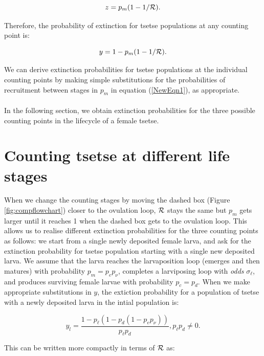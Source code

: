 \documentclass[smallextended]{svjour3}
\begin{document}
$$ z = p_m(1-1/{\cal R}).$$

Therefore,  the probability of extinction for tsetse populations at any counting point is:

\begin{equation}
\label{NewEqn1}	
y = 1 - p_m(1-1/{\cal R}).	
\end{equation}

We can derive extinction probabilities for tsetse populations at the individual counting points by making simple substitutions for the probabilities of recruitment  between stages in $p_m$  in equation (\ref{NewEqn1}), as appropriate. 
\paragraph{}


\paragraph{}
In the following section, we obtain extinction probabilities  for the three possible counting points in the lifecycle of a female tsetse.

\section{Counting tsetse at different life stages}

When we change the counting stages by moving the dashed box (Figure \ref{fig:compflowchart}) closer to the ovulation loop, ${\cal R}$ stays the same but $p_m$ gets larger until it reaches 1 when the dashed box gets to the ovulation loop. This allows us to realise different extinction probabilities for the three counting points as follows: we start from a single newly deposited female larva, and ask for the extinction probability for tsetse population starting with a single new deposited larva.
We assume that the larva reaches the larvaposition loop (emerges and then matures) with probability $p_m = p_e p_{\nu}$, completes a larviposing loop with \textit{odds} $\sigma_\ell$, and produces surviving female larvae with probability $p_c = p_d$. 
When we make appropriate substitutions in $y$, the extiction probability for a population of tsetse with a newly deposited larva in the intial population is:

$$y_l = \frac{1-p_{\ell}(1 - p_{d}(1 - p_{e}p_{\nu}))}{p_{\ell}p_{d}}, p_{\ell}p_{d} \neq 0.$$

This can be written more compactly in terms of ${\cal R}$ as:
\end{document}
